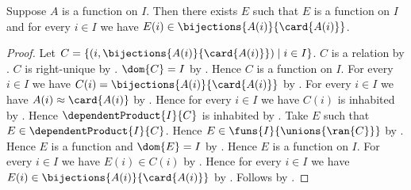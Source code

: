 \begin{theorem}\label{indexed_family_cardinal_bijections}
    Suppose $A$ is a function on $I$.
    Then there exists $E$ such that $E$ is a function on $I$ and
        for every $i\in I$ we have
            $E(i)\in\bijections{A(i)}{\card{A(i)}}$.
\end{theorem}
\begin{proof}
    Let $C=\{(i,\bijections{A(i)}{\card{A(i)}})\mid i\in I\}$.
    $C$ is a relation by .
    $C$ is right-unique by .
    $\dom{C}=I$ by .
    Hence $C$ is a function on $I$.
    For every $i\in I$ we have
        $C(i)=\bijections{A(i)}{\card{A(i)}}$
        by .
    For every $i\in I$ we have $A(i)\approx\card{A(i)}$
        by .
    Hence for every $i\in I$ we have $C(i)$ is inhabited
        by .
    Hence $\dependentProduct{I}{C}$ is inhabited
        by .
    Take $E$ such that $E\in\dependentProduct{I}{C}$.
    Hence $E\in\funs{I}{\unions{\ran{C}}}$
        by .
    Hence $E$ is a function and $\dom{E}=I$
        by .
    Hence $E$ is a function on $I$.
    For every $i\in I$ we have $E(i)\in C(i)$
        by .
    Hence for every $i\in I$ we have
        $E(i)\in\bijections{A(i)}{\card{A(i)}}$ by \auto.
    Follows by \auto.
\end{proof}

